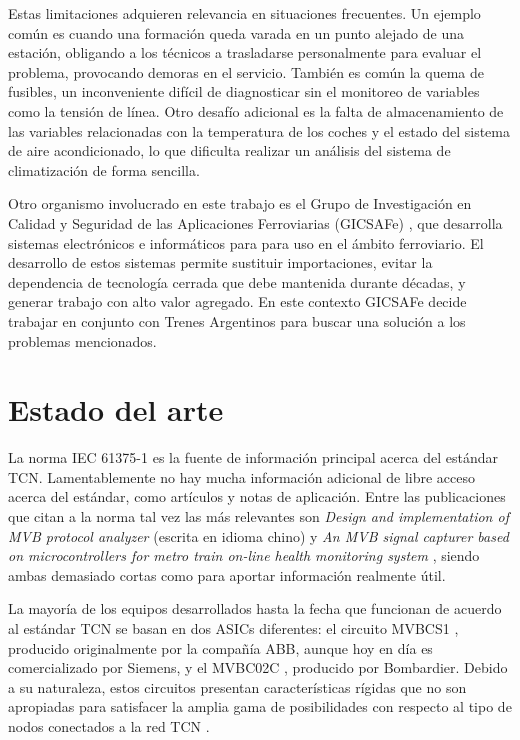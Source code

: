 Estas limitaciones adquieren relevancia en situaciones frecuentes.
Un ejemplo común es cuando una formación queda varada en un punto alejado de una estación, obligando a los técnicos a trasladarse personalmente para evaluar el problema, provocando demoras en el servicio.
También es común la quema de fusibles, un inconveniente difícil de diagnosticar sin el monitoreo de variables como la tensión de línea.
Otro desafío adicional es la falta de almacenamiento de las variables relacionadas con la temperatura de los coches y el estado del sistema de aire acondicionado, lo que dificulta realizar un análisis del sistema de climatización de forma sencilla.

Otro organismo involucrado en este trabajo es el Grupo de Investigación en Calidad y Seguridad de las Aplicaciones Ferroviarias (GICSAFe) \cite{web:gicsafe}, que desarrolla sistemas electrónicos e informáticos para para uso en el ámbito ferroviario. El desarrollo de estos sistemas permite sustituir importaciones, evitar la dependencia de tecnología cerrada que debe mantenida durante décadas, y generar trabajo con alto valor agregado. En este contexto GICSAFe decide trabajar en conjunto con Trenes Argentinos para buscar una solución a los problemas mencionados.

\section{Estado del arte}

\label{estadodelarte}

La norma IEC 61375-1 es la fuente de información principal acerca del estándar TCN. Lamentablemente no hay mucha información adicional de libre acceso acerca del estándar, como artículos y notas de aplicación. Entre las publicaciones que citan a la norma tal vez las más relevantes son \textit{Design and implementation of MVB protocol analyzer} \cite{mvb-pub-1} (escrita en idioma chino) y \textit{An MVB signal capturer based on microcontrollers for metro train on-line health monitoring system} \cite{mvb-pub-2}, siendo ambas demasiado cortas como para aportar información realmente útil.

La mayoría de los equipos desarrollados hasta la fecha que funcionan de acuerdo al estándar TCN se basan en dos ASICs diferentes: el circuito MVBCS1 \cite{mvbcs1}, producido originalmente por la compañía ABB, aunque hoy en día es comercializado por Siemens, y el MVBC02C \cite{mvbc02c}, producido por Bombardier. Debido a su naturaleza, estos circuitos presentan características rígidas que no son apropiadas para satisfacer la amplia gama de posibilidades con respecto al tipo de nodos conectados a la red TCN \cite{mvb-pub-3}.

